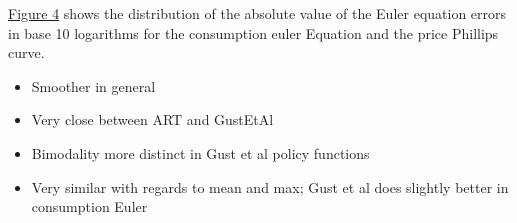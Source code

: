\documentclass[12pt, final]{article}
\begin{document}
\hyperlink{Figure 4}{Figure 4} shows the distribution of the absolute value of the Euler equation errors in base 10 logarithms for the consumption euler Equation and the price Phillips curve. 

\begin{itemize}
\item Smoother in general
\item Very close between ART and GustEtAl
  \end{itemize}

\begin{itemize}
\item Bimodality more distinct in Gust et al policy functions
\item Very similar with regards to mean and max; Gust et al does slightly better in consumption Euler
\end{itemize}
\end{document}
